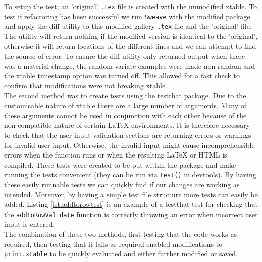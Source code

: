 \documentclass{memoir}\usepackage[]{graphicx}\usepackage[]{color}
\newcommand{\pkg}[1]{{\fontseries{b}\selectfont #1}}
\let\code=\texttt
\newcommand{\latex}{\LaTeX\xspace}
\begin{document}
To setup the test; an 'original' \code{.tex} file is created with the unmodified \pkg{xtable}. To test if refactoring has been successful we run \code{Sweave} with the modified package and apply the diff utility to this modified gallery \code{.tex} file and the 'original' file. The utility will return nothing if the modified version is identical to the 'original', otherwise it will return locations of the different lines and we can attempt to find the source of error. To ensure the diff utility only returned output when there was a material change, the random variate examples were made non-random and the \pkg{xtable} timestamp option was turned off. This allowed for a fast check to confirm that modifications were not breaking \pkg{xtable}.\\


The second method was to create tests using the \pkg{testthat} package\cite{testthat}. Due to the customisable nature of \pkg{xtable} there are a large number of arguments. Many of these arguments cannot be used in conjunction with each other because of the non-compatible nature of certain \latex environments. It is therefore necessary to check that the user input validation sections are returning errors or warnings for invalid user input. Otherwise, the invalid input might cause incomprehensible errors when the function runs or when the resulting \latex or HTML is compiled. These tests were created to be put within the package and make running the tests convenient (they can be run via \code{test()} in \pkg{devtools}\cite{devtools}). By having these easily runnable tests we can quickly find if our changes are working as intended. Moreover, by having a simple test file structure more tests can easily be added. Listing \ref{lst:addtorowtest} is an example of a \pkg{testthat} test for checking that the \code{addToRowValidate} function is correctly throwing an error when incorrect user input is entered.\\ 

The combination of these two methods, first testing that the code works as required, then testing that it fails as required enabled modifications to \code{print.xtable} to be quickly evaluated and either further modified or saved. 
\end{document}
